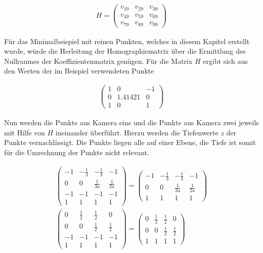 \begin{gather}
	H=
	\begin{pmatrix}
	v_{19}&v_{29}&v_{39}\\
	v_{49}&v_{59}&v_{69}\\
	v_{79}&v_{89}&v_{99}
	\end{pmatrix}
\end{gather}

Für das Minimalbeispiel mit reinen Punkten, welches in diesem Kapitel erstellt wurde, würde die Herleitung der Homographiematrix über die Ermittlung des Nullraumes der Koeffizientenmatrix genügen. Für die Matrix $H$ ergibt sich aus den Werten der im Beispiel verwendeten Punkte

\begin{gather}
	\begin{pmatrix}
	1&0&-1\\
	0&1.41421&0\\
	1&0&1
	\end{pmatrix}
\end{gather}

Nun werden die Punkte aus Kamera eins und die Punkte aus Kamera zwei jeweils mit Hilfe von $H$ ineinander überführt. Hierzu werden die Tiefenwerte $z$ der Punkte vernachlässigt. Die Punkte liegen alle auf einer Ebene, die Tiefe ist somit für die Umrechnung der Punkte nicht relevant.

\begin{gather}
		\begin{pmatrix}
	-1&-\frac{1}{3}&-\frac{1}{3}&-1\\
	0&0&\frac{1}{3a}&\frac{1}{2a}\\
	-1&-1&-1&-1\\
	1&1&1&1
	\end{pmatrix}
	=
		\begin{pmatrix}
	-1&-\frac{1}{3}&-\frac{1}{3}&-1\\
	0&0&\frac{1}{3a}&\frac{1}{2a}\\
	1&1&1&1
	\end{pmatrix}\\
		\begin{pmatrix}
	0&\frac{1}{2}&\frac{1}{2}&0\\
	0&0&\frac{1}{2}&\frac{1}{2}\\
	-1&-1&-1&-1\\
	1&1&1&1
	\end{pmatrix}
	=
		\begin{pmatrix}
	0&\frac{1}{2}&\frac{1}{2}&0\\
	0&0&\frac{1}{2}&\frac{1}{2}\\
	1&1&1&1
	\end{pmatrix}
\end{gather}

